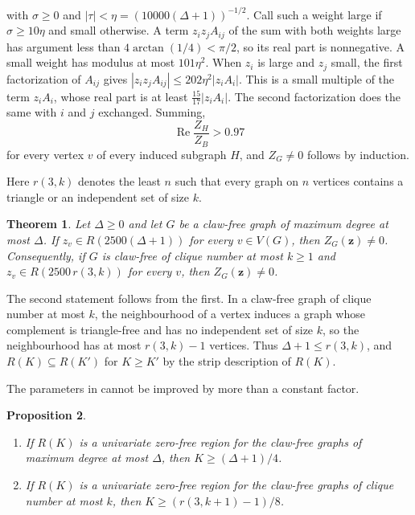 \documentclass[11pt]{article}
\newtheorem{theorem}{Theorem}[section]
\newtheorem{proposition}[theorem]{Proposition}
\theoremstyle{remark}
\renewcommand{\Re}{\operatorname{Re}}
\begin{document}
with $\sigma\ge0$ and $|\tau|<\eta=(10000(\Delta+1))^{-1/2}$. Call such a weight large if $\sigma\ge10\eta$ and small
otherwise. A term $z_iz_jA_{ij}$ of the sum with both weights large has argument less than $4\arctan(1/4)<\pi/2$, so its real
part is nonnegative. A small weight has modulus at most $101\eta^2$. When $z_i$ is large and $z_j$ small, the first
factorization of $A_{ij}$ gives $|z_iz_jA_{ij}|\le202\eta^2|z_iA_i|$. This is a small multiple of the term $z_iA_i$,
whose real part is at least $\tfrac{15}{17}|z_iA_i|$. The second factorization does the same with $i$ and $j$ exchanged.
Summing,
\[
\Re\frac{Z_H}{Z_B}>0.97
\]
for every vertex $v$ of every induced subgraph $H$, and $Z_G\ne0$ follows by induction.

Here $r(3,k)$ denotes the least $n$ such that every graph on $n$ vertices contains a triangle or an independent set of
size $k$.

\begin{theorem}\label{thm:main}
Let $\Delta\ge0$ and let $G$ be a claw-free graph of maximum degree at most $\Delta$. If $z_v\in R(2500(\Delta+1))$
for every $v\in V(G)$, then $Z_G(\boldsymbol z)\ne0$. Consequently, if $G$ is claw-free of clique number at most
$k\ge1$ and $z_v\in R(2500\,r(3,k))$ for every $v$, then $Z_G(\boldsymbol z)\ne0$.
\end{theorem}

The second statement follows from the first. In a claw-free graph of clique number at most $k$, the neighbourhood
of a vertex induces a graph whose complement is triangle-free and has no independent set of size $k$, so the
neighbourhood has at most $r(3,k)-1$ vertices.
Thus $\Delta+1\le r(3,k)$, and $R(K)\subseteq R(K')$ for $K\ge K'$ by the strip description of $R(K)$.

The parameters in  cannot be improved by more than a constant factor.

\begin{proposition}\label{prop:lower}
\begin{enumerate}[label=(\alph*)]
\item If $R(K)$ is a univariate zero-free region for the claw-free graphs of maximum
degree at most $\Delta$, then $K\ge(\Delta+1)/4$.
\item If $R(K)$ is a univariate zero-free region for the claw-free graphs of clique
number at most $k$, then $K\ge(r(3,k+1)-1)/8$.
\end{enumerate}
\end{proposition}
\end{document}
